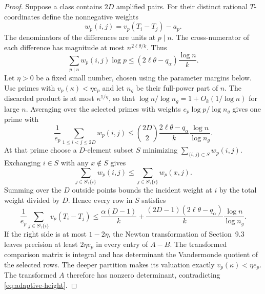 \documentclass[11pt,reqno]{amsart}
\begin{document}
\begin{proof}
Suppose a class contains \(2D\) amplified pairs. For their
distinct rational \(T\)-coordinates define the nonnegative
weights
\[
 w_p(i,j)=v_p(T_i-T_j)-a_p .
\]
The denominators of the differences are units at \(p\mid n\).
The cross-numerator of each difference has magnitude at
most \(n^{2\ell\theta/k}\). Thus
\[
 \sum_{p\mid n} w_p(i,j)\log p
 \le (2\ell\theta-q_\alpha)\frac{\log n}{k}.
\]
Let \(\eta>0\) be a fixed small number, chosen using the
parameter margins below. Use primes with \(v_p(\kappa)<\eta e_p\)
and let \(n_g\) be their full-power part of \(n\).
The discarded product is at most \(\kappa^{1/\eta}\),
so that \(\log n/\log n_g=1+O_k(1/\log n)\) for large \(n\).
Averaging over the selected primes with weights
\(e_p\log p/\log n_g\) gives one prime with
\[
 \frac{1}{e_p}\sum_{1\le i<j\le2D}w_p(i,j)
 \le \binom{2D}{2}\frac{2\ell\theta-q_\alpha}{k}
                  \frac{\log n}{\log n_g}.
\]
At that prime choose a \(D\)-element subset \(S\)
minimizing \(\sum_{\{i,j\}\subset S}w_p(i,j)\).
Exchanging \(i\in S\) with any \(x\notin S\) gives
\[
 \sum_{j\in S\setminus\{i\}}w_p(i,j)
 \le\sum_{j\in S\setminus\{i\}}w_p(x,j).
\]
Summing over the \(D\) outside points bounds the incident
weight at \(i\) by the total weight divided by \(D\).
Hence every row in \(S\) satisfies
\[
 \frac{1}{e_p}\sum_{j\in S\setminus\{i\}}v_p(T_i-T_j)
 \le\frac{\alpha(D-1)}{k}
   +\frac{(2D-1)(2\ell\theta-q_\alpha)}{k}
                         \frac{\log n}{\log n_g}.
\]
If the right side is at most \(1-2\eta\), the Newton
transformation of Section~9.3 leaves precision at least
\(2\eta e_p\) in every entry of \(A-B\).
The transformed comparison matrix is integral and has
determinant the Vandermonde quotient of the selected rows.
The deeper partition makes its valuation exactly
\(v_p(\kappa)<\eta e_p\).
The transformed \(A\) therefore has nonzero determinant,
contradicting \eqref{eq:adaptive-height}.


\end{proof}
\end{document}
